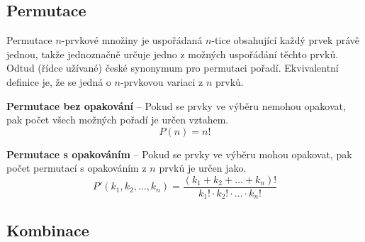 \subsection{Permutace}

\begin{compactitem}
    \item Permutace $n$-prvkové množiny je uspořádaná $n$-tice obsahující každý prvek právě jednou, takže jednoznačně určuje jedno z možných uspořádání těchto prvků. Odtud (řídce užívané) české synonymum pro permutaci pořadí. Ekvivalentní definice je, že se jedná o $n$-prvkovou variaci z $n$ prvků.

    \item \textbf{Permutace bez opakování} -- Pokud se prvky ve výběru nemohou opakovat, pak počet všech možných pořadí je určen vztahem.
    $$ P(n) = n! $$

    \item \textbf{Permutace s opakováním} -- Pokud se prvky ve výběru mohou opakovat, pak počet permutací s opakováním z $n$ prvků je určen jako.
    $$ P'{(k_1,k_2,\ldots,k_n)} = \frac {(k_1+k_2+\ldots+k_n)!}{{k_1!}\cdot{k_2!}\cdot\ldots\cdot{k_n!}} $$
\end{compactitem}

\subsection{Kombinace}

